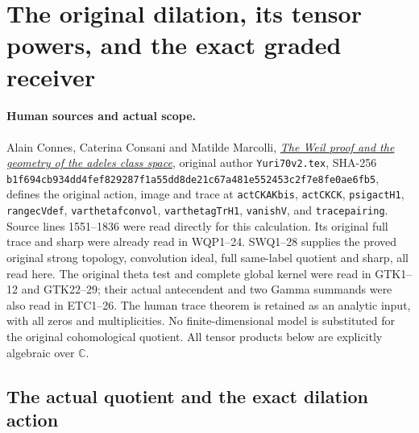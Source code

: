 \section{The original dilation, its tensor powers, and the exact graded receiver}
\label{sec:global-dilation-tensor-receiver}

\paragraph{Human sources and actual scope.}
Alain Connes, Caterina Consani and Matilde Marcolli,
\href{https://arxiv.org/abs/math/0703392v1}{\emph{The Weil proof and the
geometry of the adeles class space}}, original author
\nolinkurl{Yuri70v2.tex}, SHA-256
\nolinkurl{b1f694cb934dd4fef829287f1a55dd8de21c67a481e552453c2f7e8fe0ae6fb5},
defines the original action, image and trace at
\texttt{actCKAKbis}, \texttt{actCKCK}, \texttt{psigactH1},
\texttt{rangecVdef}, \texttt{varthetafconvol},
\texttt{varthetagTrH1}, \texttt{vanishV}, and \texttt{tracepairing}.
Source lines 1551--1836 were read directly for this calculation.
Its original full trace and sharp were already read in WQP1--24.
SWQ1--28 supplies the proved original strong topology, convolution
ideal, full same-label quotient and sharp, all read here.
The original theta test and complete global kernel were read in
GTK1--12 and GTK22--29; their actual antecendent and two Gamma
summands were also read in ETC1--26. The human trace theorem is
retained as an analytic input, with all zeros and multiplicities.
No finite-dimensional model is substituted for the original
cohomological quotient. All tensor products below are explicitly
algebraic over $\mathbb C$.

\subsection{The actual quotient and the exact dilation action}

